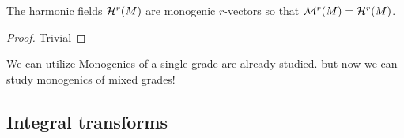 \begin{proposition}
    The harmonic fields $\mathcal{H}^{r}(M)$ are monogenic $r$-vectors so that $\mathcal{M}^{r}(M) = \mathcal{H}^{r}(M)$.
\end{proposition}
\begin{proof}
Trivial
\end{proof}

We can utilize 
Monogenics of a single grade are already studied. but now we can study monogenics of mixed grades!
\subsection{Integral transforms}
